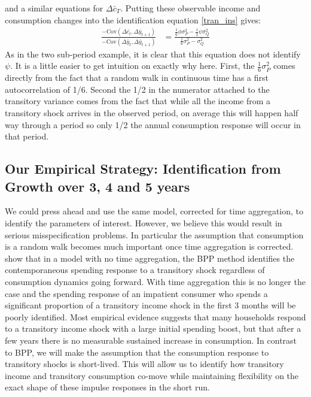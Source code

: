 \documentclass[titlepage]{\econtex}\newcommand{\texname}{IncomeUncertainty}
\begin{document}
and a similar equations for $\Delta \bar{c}_T$. Putting these observable income and consumption changes into the identification equation \ref{tran_ins} gives:
	\begin{align}
	\frac{-\mathrm{Cov}(\Delta \bar{c_t}, \Delta \bar{y}_{t+1})}{-\mathrm{Cov}( \Delta \bar{y}_t, \Delta \bar{y}_{t+1})}
	&= \frac{ \frac{1}{6}\phi \sigma^2_P - \frac{1}{2}\psi \sigma^2_Q}{ \frac{1}{6} \sigma^2_P -  \sigma^2_Q} \label{psi_cont}
	\end{align}
As in the two sub-period example, it is clear that this equation does not identify $\psi$. It is a little easier to get intuition on exactly why here. First, the $\frac{1}{6} \sigma^2_P$ comes directly from the fact that a random walk in continuous time has a first autocorrelation of 1/6. Second the 1/2 in the numerator attached to the transitory variance comes from the fact that while all the income from a transitory shock arrives in the observed period, on average this will happen half way through a period so only 1/2 the annual consumption response will occur in that period.

\subsection{Our Empirical Strategy: Identification from Growth over 3, 4 and 5 years}
We could press ahead and use the same model, corrected for time aggregation, to identify the parameters of interest. However, we believe this would result in serious misspecification problems. In particular the assumption that consumption is a random walk becomes much important once time aggregation is corrected. \cite{kaplan_how_2010} show that in a model with no time aggregation, the BPP method identifies the contemporaneous spending response to a transitory shock regardless of consumption dynamics going forward. With time aggregation this is no longer the case and the spending response of an impatient consumer who spends a significant proportion of a transitory income shock in the first 3 months will be poorly identified. Most empirical evidence suggests that many households respond to a transitory income shock with a large initial spending boost, but that after a few years there is no measurable sustained increase in consumption. In contrast to BPP, we will make the assumption that the consumption response to transitory shocks is short-lived. This will allow us to identify how transitory income and transitory consumption co-move while maintaining flexibility on the exact shape of these impulse responses in the short run.
\end{document}
